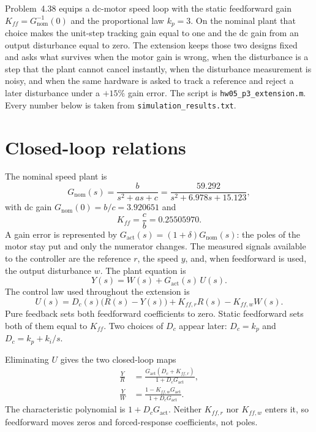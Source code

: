\documentclass[12pt,a4paper]{article}
\begin{document}
Problem~4.38 equips a dc-motor speed loop with the static feedforward gain \(K_{ff}=G_{\mathrm{nom}}^{-1}(0)\) and the proportional law \(k_p=3\).
On the nominal plant that choice makes the unit-step tracking gain equal to one and the dc gain from an output disturbance equal to zero.
The extension keeps those two designs fixed and asks what survives when the motor gain is wrong, when the disturbance is a step that the plant cannot cancel instantly, when the disturbance measurement is noisy, and when the same hardware is asked to track a reference and reject a later disturbance under a \(+15\%\) gain error.
The script is \texttt{hw05\_p3\_extension.m}. Every number below is taken from \texttt{simulation\_results.txt}.

\section{Closed-loop relations}

The nominal speed plant is
\begin{equation}
  G_{\mathrm{nom}}(s)=\frac{b}{s^2+as+c}
  =\frac{59.292}{s^2+6.978s+15.123},
  \label{eq:Gnom}
\end{equation}
with dc gain \(G_{\mathrm{nom}}(0)=b/c=3.920651\) and
\begin{equation}
  K_{ff}=\frac{c}{b}=0.25505970.
  \label{eq:Kff}
\end{equation}
A gain error is represented by \(G_{\mathrm{act}}(s)=(1+\delta)G_{\mathrm{nom}}(s)\): the poles of the motor stay put and only the numerator changes.
The measured signals available to the controller are the reference \(r\), the speed \(y\), and, when feedforward is used, the output disturbance \(w\). The plant equation is
\begin{equation}
  Y(s)=W(s)+G_{\mathrm{act}}(s)\,U(s).
  \label{eq:plant}
\end{equation}
The control law used throughout the extension is
\begin{equation}
  U(s)=D_c(s)\bigl(R(s)-Y(s)\bigr)+K_{ff,r}R(s)-K_{ff,w}W(s).
  \label{eq:law}
\end{equation}
Pure feedback sets both feedforward coefficients to zero.
Static feedforward sets both of them equal to \(K_{ff}\).
Two choices of \(D_c\) appear later: \(D_c=k_p\) and \(D_c=k_p+k_i/s\).

Eliminating \(U\) gives the two closed-loop maps
\begin{align}
  \frac{Y}{R}
  &=\frac{G_{\mathrm{act}}(D_c+K_{ff,r})}{1+D_c G_{\mathrm{act}}},
  \label{eq:YR}\\
  \frac{Y}{W}
  &=\frac{1-K_{ff,w}G_{\mathrm{act}}}{1+D_c G_{\mathrm{act}}}.
  \label{eq:YW}
\end{align}
The characteristic polynomial is \(1+D_c G_{\mathrm{act}}\). Neither \(K_{ff,r}\) nor \(K_{ff,w}\) enters it, so feedforward moves zeros and forced-response coefficients, not poles.
\end{document}
